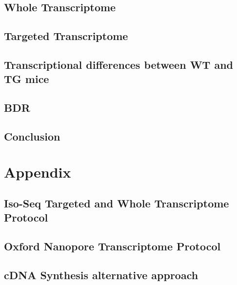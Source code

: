 \documentclass[a4paper,12pt,oneside]{report}
\begin{document}
\chapter{Whole Transcriptome}


\chapter{Targeted Transcriptome}


\chapter{Transcriptional differences between WT and TG mice}

%

\chapter{BDR}
%

\chapter{Conclusion}
%

\newpage
\part{Appendix} %
\begin{appendix}
\chapter{Iso-Seq Targeted and Whole Transcriptome Protocol}

\chapter{Oxford Nanopore Transcriptome Protocol}

\chapter{cDNA Synthesis alternative approach}
\label{ch:alt_cDNA}
%
\end{appendix}



\end{document}
